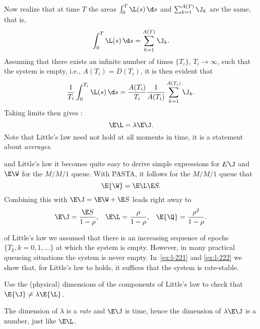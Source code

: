 Now realize that at time $T$ the areas $\int_0^T \L(s)\, \d s$ and $\sum_{k=1}^{A(T)} \J_k$ are the same, that is,
\begin{equation}\label{eq:111}
 \int_0^T \L(s)\, \d s = \sum_{k=1}^{A(T)} \J_k.
\end{equation}
Assuming that there exists an infinite number of times $\{T_i\}$,  $T_i\to\infty$, such that the system is empty, i.e.,  $A(T_i) = D(T_i)$, it is then evident that
\begin{equation*}
 \frac 1 {T_i} \int_0^{T_i} \L(s)\, \d s = \frac{A(T_i)} {T_i} \frac{1}{A(T_i)} \sum_{k=1}^{A(T_i)} \J_k.
\end{equation*}
Taking limits then gives :
\begin{equation*}
 \E \L = \lambda \E \J.
\end{equation*}
Note that Little's law need not hold at all moments in time, it is a statement about \emph{averages}.


 and Little's law it becomes quite easy to derive simple expressions for $E\J$ and $\E\W$ for the $M/M/1$ queue.
With PASTA, it follows for the $M/M/1$ queue that
\begin{equation}\label{eq:wqes}
 \E{\W} = \E \L \E S.
\end{equation}
Combining this with $\E\J = \E \W + \E S$ leads right away to
 \begin{align}\label{eq:110}
 \E\J &= \frac{\E S}{1-\rho}, & \E \L &= \frac\rho{1-\rho}, & \E{\Q} = \frac{\rho^2}{1-\rho}.
 \end{align}


  of Little's law we assumed that there is an increasing sequence of epochs $\{T_k, k=0,1,\ldots\}$ at which the system is empty.
 However, in many practical queueing situations the system is never empty.
 In~\cref{ex:l-221} and \cref{ex:l-222} we show that, for Little's law to holds, it suffices that the system is rate-stable.



\begin{exercise}\label{ex:42}
  Use
  the (physical) dimensions of the components of Little's law to check that $\E{\J} \neq \lambda \E{\L}$.
\begin{solution}
  The dimension of $\lambda$ is a \emph{rate} and $\E \J$ is time, hence the dimension of $\lambda \E \J$ is a number, just like $\E \L$.
\end{solution}
\end{exercise}


